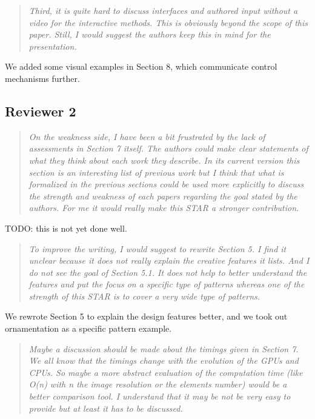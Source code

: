 \documentclass{egpubl}
\newcommand{\rev}[2]{{\color{greenrev}\textsuperscript{#1}#2}}
\renewcommand{\rev}[2]{{#2}}
\begin{document}
\begin{quote}
\emph{Third, it is quite hard to discuss interfaces and authored input without a video for the interactive methods. This is obviously beyond the scope of this paper. Still, I would suggest the authors keep this in mind for the presentation.}
\end{quote}

\rev{}{We added some visual examples in Section 8, which communicate control mechanisms further.}



\subsection*{Reviewer 2}

\begin{quote}
\emph{On the weakness side, I have been a bit frustrated by the lack of assessments in Section 7 itself. The authors could make clear statements of what they think about each work they describe. In its current version this section is an interesting list of previous work but I think that what is formalized in the previous sections could be used more explicitly to discuss the strength and weakness of each papers regarding the goal stated by the authors. 
For me it would really make this STAR a stronger contribution.}
\end{quote}

\rev{}{\color{red}TODO: this is not yet done well.}

\begin{quote}
\emph{To improve the writing, I would suggest to rewrite Section 5. I find it unclear because it does not really explain the creative features it lists. And I do not see the goal of Section 5.1. It does not help to better understand the features and put the focus on a specific type of patterns whereas one of the strength of this STAR is to cover a very wide type of patterns.}
\end{quote}


\rev{}{We rewrote Section 5 to explain the design features better, and we took out ornamentation as a specific pattern example.}

\begin{quote}
\emph{Maybe a discussion should be made about the timings given in Section 7. We all know that the timings change with the evolution of the GPUs and CPUs. So maybe a more abstract evaluation of the computation time (like O(n) with n the image resolution or the elements number) would be a better comparison tool. I understand that it may be not be very easy to provide but at least it has to be discussed.}
\end{quote}
\end{document}

